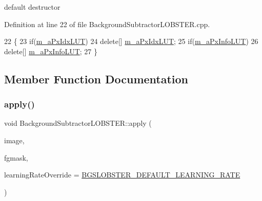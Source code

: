 default destructor 



Definition at line 22 of file Background\+Subtractor\+L\+O\+B\+S\+T\+E\+R.\+cpp.


\begin{DoxyCode}
22                                                           \{
23     \textcolor{keywordflow}{if}(\mbox{\hyperlink{class_background_subtractor_l_b_s_p_a06b4f0d3f24fa08bccd3c9eca085713e}{m\_aPxIdxLUT}})
24         \textcolor{keyword}{delete}[] \mbox{\hyperlink{class_background_subtractor_l_b_s_p_a06b4f0d3f24fa08bccd3c9eca085713e}{m\_aPxIdxLUT}};
25     \textcolor{keywordflow}{if}(\mbox{\hyperlink{class_background_subtractor_l_b_s_p_a74e73d4832ccdef652d93756582024db}{m\_aPxInfoLUT}})
26         \textcolor{keyword}{delete}[] \mbox{\hyperlink{class_background_subtractor_l_b_s_p_a74e73d4832ccdef652d93756582024db}{m\_aPxInfoLUT}};
27 \}
\end{DoxyCode}


\subsection{Member Function Documentation}
\mbox{\label{class_background_subtractor_l_o_b_s_t_e_r_a58c127d4b95230d1e7fdc64055943ef3}} 
\subsubsection{\texorpdfstring{apply()}{apply()}}
{\footnotesize\ttfamily void Background\+Subtractor\+L\+O\+B\+S\+T\+E\+R\+::apply (\begin{DoxyParamCaption}\item[{cv\+::\+Input\+Array}]{image,  }\item[{cv\+::\+Output\+Array}]{fgmask,  }\item[{double}]{learning\+Rate\+Override = {\ttfamily \mbox{\hyperlink{_background_subtractor_l_o_b_s_t_e_r_8h_a2d317f4a065c4c58c7241080d9c4457c}{B\+G\+S\+L\+O\+B\+S\+T\+E\+R\+\_\+\+D\+E\+F\+A\+U\+L\+T\+\_\+\+L\+E\+A\+R\+N\+I\+N\+G\+\_\+\+R\+A\+TE}}} }\end{DoxyParamCaption})\hspace{0.3cm}{\ttfamily [virtual]}}



